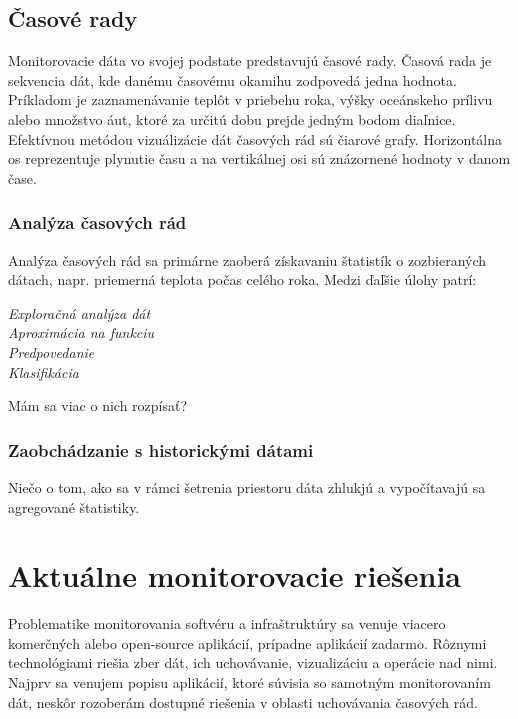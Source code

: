 \documentclass[11pt,final,oneside]{fithesis}
\begin{document}
\section{Časové rady}
Monitorovacie dáta vo svojej podstate predstavujú časové rady.
Časová rada je sekvencia dát, kde danému časovému okamihu zodpovedá jedna hodnota. Príkladom je zaznamenávanie teplôt v priebehu roka, výšky oceánskeho prílivu alebo množstvo áut, ktoré za určitú dobu
prejde jedným bodom diaľnice. Efektívnou metódou vizuálizácie dát časových rád sú čiarové grafy. Horizontálna os reprezentuje plynutie času a na vertikálnej osi sú znázornené hodnoty v danom čase.

\subsection{Analýza časových rád}
Analýza časových rád sa primárne zaoberá získavaniu štatistík o zozbieraných dátach, napr. priemerná teplota počas celého roka. Medzi ďaľšie úlohy patrí:
\begin{description}
\item[\emph{Exploračná analýza dát}]
\item[\emph{Aproximácia na funkciu}] 
\item[\emph{Predpovedanie}] 
\item[\emph{Klasifikácia}] 
\end{description}
Mám sa viac o nich rozpísať?

\subsection{Zaobchádzanie s historickými dátami}
Niečo o tom, ako sa v rámci šetrenia priestoru dáta zhlukjú a vypočítavajú sa agregované štatistiky.

\chapter{Aktuálne monitorovacie riešenia}
Problematike monitorovania softvéru a infraštruktúry sa venuje viacero komerčných alebo open-source aplikácií, prípadne aplikácií zadarmo. Rôznymi technológiami riešia zber dát, ich uchovávanie, vizualizáciu a operácie nad
nimi. Najprv sa venujem popisu aplikácií, ktoré súvisia so samotným monitorovaním dát, neskôr rozoberám dostupné riešenia v oblasti uchovávania časových rád.
\end{document}
